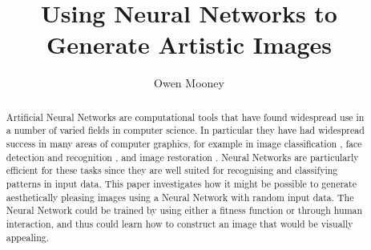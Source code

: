 \documentclass{acm_proc_article-sp}
\begin{document}

\title{Using Neural Networks to Generate Artistic Images}
\author{Owen Mooney}

\maketitle

\begin{abstract}
Artificial Neural Networks are computational tools that have found widespread use in a number of varied fields in computer science. In particular they have had widespread success in many areas of computer graphics, for example in image classification \cite{Zhang:1992:ANN:503720.503776}, face detection \cite{Lee:2002:EAF:646864.708276} and recognition \cite{Zhao:2003:FRL:954339.954342}, and image restoration \cite{deCastro:2008:RIM:1363686.1364088}. Neural Networks are particularly efficient for these tasks since they are well suited for recognising and classifying patterns in input data. This paper investigates how it might be possible to generate aesthetically pleasing images using a Neural Network with random input data. The Neural Network could be trained by using either a fitness function or through human interaction, and thus could learn how to construct an image that would be visually appealing.
\end{abstract}
\end{document}
